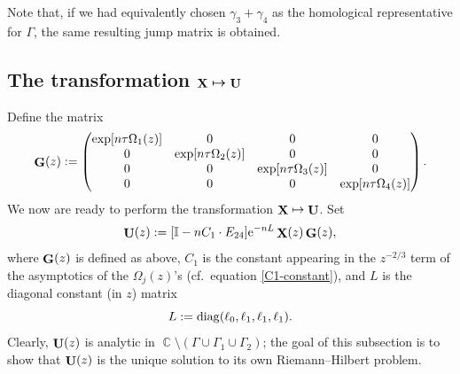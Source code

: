 \documentclass[pdftex]{sigma}
\DeclareMathOperator{\CC}{\mathbb{C}}
\DeclareMathOperator{\XX}{{\bf X}}
\DeclareMathOperator{\UU}{{\bf U}}
\DeclareMathOperator{\GG}{{\bf G}}
\numberwithin{equation}{section}
\begin{document}
\begin{Remark}
 Note that, if we had equivalently chosen $\gamma_3 + \gamma_4$ as the homological representative for $\Gamma$, the same resulting jump matrix is obtained.
\end{Remark}

\subsection[The transformation $\XX \mapsto \UU$]{The transformation $\boldsymbol{\XX \mapsto \UU}$}

Define the matrix
 \begin{equation*}%
 \GG(z) :=
 \begin{pmatrix}
 \exp[n\tau\Omega_1(z)] & 0 & 0 & 0\\
 0 & \exp[n\tau\Omega_2(z)] & 0 & 0\\
 0 & 0 & \exp[n\tau\Omega_3(z)] & 0\\
 0 & 0 & 0 & \exp[n\tau\Omega_4(z)]
 \end{pmatrix}.
 \end{equation*}
We now are ready to perform the transformation $\XX \mapsto \UU$. Set
 \begin{equation*}
 \UU(z) := [\mathbb{I} -nC_1\cdot E_{24}]{\rm e}^{-n L}\XX(z) \GG(z),
 \end{equation*}
where $\GG(z)$ is defined as above, $C_1$ is the constant appearing in the $z^{-2/3}$ term of the asymptotics of the $\Omega_j(z)$'s (cf.\ equation \eqref{C1-constant}), and $L$ is the diagonal constant (in $z$) matrix
 \begin{equation*}
 L := {\rm diag} (\ell_0, \ell_1, \ell_1, \ell_1).
 \end{equation*}
Clearly, $\UU(z)$ is analytic in $\CC \setminus (\Gamma \cup \Gamma_1 \cup \Gamma_2 )$; the goal of this subsection is to show that $\UU(z)$ is the unique solution
to its own Riemann--Hilbert problem.
\end{document}
